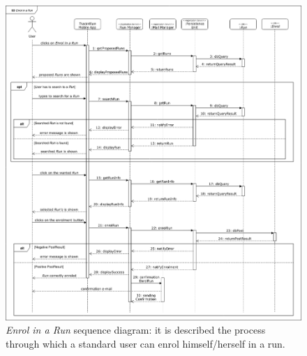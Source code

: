 \begin{figure}[H]
  \begin{center}
  	\includegraphics[width=\textwidth]{./img/sequence/enrolRun.png}
    \hspace{0.05\linewidth}
    \centering
    \caption{\textit{Enrol in a Run} sequence diagram: it is described the process through which a standard user can enrol himself/herself in a run. }
		\label{img:enrolRun}
    \end{center}
\end{figure}

